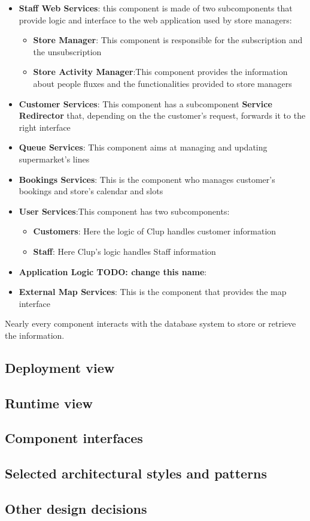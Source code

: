 \begin{itemize}
	\item \textbf{Staff Web Services}: this component is made of two subcomponents that provide logic and interface to the web application used by store managers:
	\begin{itemize}
		\item \textbf{Store Manager}: This component is responsible for the subscription and the unsubscription 
		\item \textbf{Store Activity Manager}:This component provides the information about people fluxes and the functionalities provided to store managers
	\end{itemize}
	\item \textbf{Customer Services}: This component has a subcomponent \textbf{Service Redirector} that, depending on the the customer's request, forwards it to the right interface
	\item \textbf{Queue Services}: This component aims at managing and updating supermarket's lines 
	\item \textbf{Bookings Services}: This is the component who manages customer's bookings and store's calendar and slots 
	\item \textbf{User Services}:This component has two subcomponents:
	\begin{itemize}
		\item \textbf{Customers}: Here the logic of Clup handles customer information 
		\item \textbf{Staff}: Here Clup's logic handles Staff information
	\end{itemize}
	\item \textbf{Application Logic TODO: change this name}:
	\item \textbf{External Map Services}: This is the component that provides the map interface
\end{itemize}
Nearly every component interacts with the database system to store or retrieve the information.
\subsection{Deployment view}
\subsection{Runtime view}
\subsection{Component interfaces}
\subsection{Selected architectural styles and patterns}
\subsection{Other design decisions}
